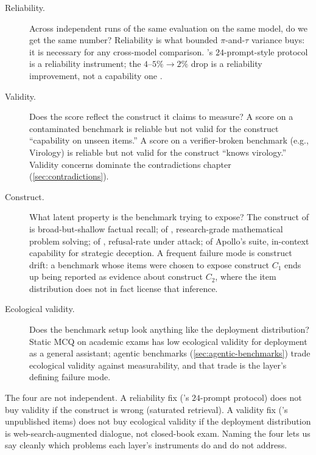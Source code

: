 \begin{description}
  \item[Reliability.] Across independent runs of the same evaluation
    on the same model, do we get the same number? Reliability is what
    bounded $\pi$-and-$\tau$ variance buys: it is necessary for any
    cross-model comparison. \citet{wang2024-mmlu-pro}'s
    $24$-prompt-style protocol is a reliability instrument; the
    $4\text{--}5\%\to 2\%$ drop is a reliability improvement, not a
    capability one \citep[\S{}abstract]{wang2024-mmlu-pro}.

  \item[Validity.] Does the score reflect the construct it claims to
    measure? A score on a contaminated benchmark is reliable but not
    valid for the construct ``capability on unseen items.'' A score
    on a verifier-broken benchmark (e.g.,  Virology) is reliable
    but not valid for the construct ``knows virology.'' Validity
    concerns dominate the contradictions chapter
    (\cref{sec:contradictions}).

  \item[Construct.] What latent property is the benchmark trying to
    expose? The construct of  is broad-but-shallow factual
    recall; of , research-grade mathematical problem
    solving; of , refusal-rate under attack; of Apollo's
     suite, in-context capability for strategic deception.
    A frequent failure mode is construct drift: a benchmark whose
    items were chosen to expose construct $C_1$ ends up being
    reported as evidence about construct $C_2$, where the item
    distribution does not in fact license that inference.

  \item[Ecological validity.] Does the benchmark setup look anything
    like the deployment distribution? Static MCQ on academic exams
    has low ecological validity for deployment as a general
    assistant; agentic benchmarks
    (\cref{sec:agentic-benchmarks}) trade ecological validity
    against measurability, and that trade is the layer's defining
    failure mode.
\end{description}

The four are not independent. A reliability fix ('s
$24$-prompt protocol) does not buy validity if the construct is wrong
(saturated retrieval). A validity fix ('s unpublished
items) does not buy ecological validity if the deployment distribution
is web-search-augmented dialogue, not closed-book exam. Naming the
four lets us say cleanly which problems each layer's instruments do
and do not address.

